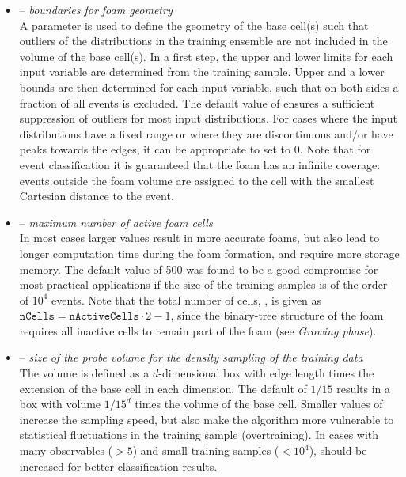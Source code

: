 \begin{itemize}
\item {} -- {\em boundaries for foam geometry}\\
A parameter
 is used to define the geometry of the base
cell(s) such that outliers of the distributions in the training ensemble
are not included in the volume of the base cell(s). In a first
step, the upper and lower limits for each input variable are determined
from the training sample.  Upper and a lower bounds are then
determined for each input variable, such that on both sides a fraction 
 of all events is excluded.
The default value of  ensures a sufficient
suppression of outliers for most input distributions. For cases where
the input distributions have a fixed range or where they are
discontinuous and/or have peaks towards the edges, it can be 
appropriate to set  to 0.
Note that for event classification it is guaranteed that 
the foam has an infinite coverage: events outside the foam volume 
are assigned to the cell with the smallest Cartesian distance to the event.

\item {} -- {\em maximum number of active foam cells }\\
In most cases larger  values result in more accurate 
foams, but also lead to longer computation time during the foam formation, 
and require more storage memory. The default value of 500
was found to be a good compromise for most practical applications if
the size of the training samples is of the order of $10^4$ events.
Note that the total number of cells, , is given
as $\texttt{nCells}=\texttt{nActiveCells}\cdot 2-1$,
since the binary-tree structure of the foam requires all inactive
cells to remain part of the foam (see \emph{Growing phase}).

\item {} -- {\em size of the probe volume for the density sampling of the training data}\\
The volume is defined as a $d$-dimensional box with edge length
 times the extension of the base cell in each dimension. 
The default of $1/15$ results in a box with volume $1/15^{d}$ times
the volume of the base cell. Smaller values of 
increase the sampling speed, but also make the algorithm more
vulnerable to statistical fluctuations in the training sample (overtraining).
In cases with many observables ($>5$) and small training samples ($<10^4$),
 should be increased for better classification results. 


\end{itemize}
